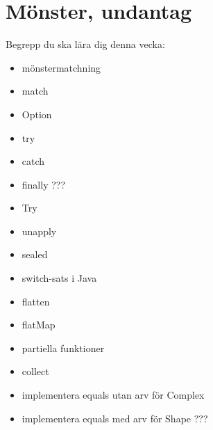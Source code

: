 \chapter{Mönster, undantag}\label{chapter:W08}
Begrepp du ska lära dig denna vecka:
\begin{itemize}[noitemsep,label={$\square$},leftmargin=*]
\item mönstermatchning
\item match
\item Option
\item try
\item catch
\item finally ???
\item Try
\item unapply
\item sealed
\item switch-sats i Java
\item flatten
\item flatMap
\item partiella funktioner
\item collect
\item implementera equals utan arv för Complex
\item implementera equals med arv för Shape ???\end{itemize}
